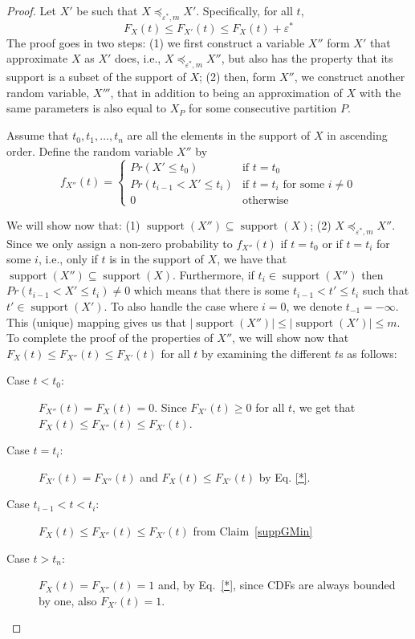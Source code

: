 \documentclass[review]{elsarticle}
\DeclareMathOperator{\support}{support}
\begin{document}
\begin{proof}
Let $X'$ be such that $X \preceq_{\varepsilon^*,m} X'$. Specifically, for all $t$,
\begin{equation}
F_{X}(t) \leq F_{X'}(t) \leq F_X(t)+\varepsilon^*
\label{*}
\end{equation}
The proof goes in two steps: (1) we first construct a variable $X''$ form $X'$ that approximate $X$ as $X'$ does, i.e., $X \preceq_{\varepsilon^*,m} X''$, but also has the property that its support is a subset of the support of $X$; (2) then, form $X''$, we construct another random variable, $X'''$, that in addition to being an approximation of $X$ with the same parameters is also equal to $X_P$ for some consecutive partition $P$. 


Assume that $t_0,t_1,\dots,t_n$ are all the elements in the support of $X$ in ascending order. Define the random variable $X''$ by 
$$
f_{X''}(t) = \begin{cases}
Pr(X' \leq t_0)           & \text{if } t=t_0  \\ 
Pr(t_{i-1} < X' \leq t_i) & \text{if } t=t_i \text{ for some } i \neq 0 \\ 
0                         & \text{otherwise}
\end{cases}
$$

We will show now that: (1) $\support(X'') \subseteq \support(X)$; (2) $X \preceq_{\varepsilon^*,m} X''$.
Since we only assign a non-zero probability to $f_{X''}(t)$ if $t=t_0$ or if $t=t_i$ for some $i$, i.e., only if $t$ is in the support of $X$, we have that $\support(X'') \subseteq \support(X)$. 
Furthermore, if $t_i \in \support(X'')$ then $Pr(t_{i-1} < X' \leq t_i) \neq 0$ which means that there is some $t_{i-1} < t' \leq t_i$ such that $t' \in \support(X')$. To also handle the case where $i=0$, we denote $t_{-1}=-\infty$. This (unique) mapping gives us that $|\support(X'')| \leq |\support(X')| \leq m$. To complete the proof of the properties of $X''$, we will show now that $F_{X}(t) \leq  F_{X''}(t) \leq F_{X'}(t)$ for all $t$ by examining the different $t$s as follows: 
\begin{description}
\item[Case $t < t_0$:] $F_{X''}(t)=F_{X}(t)=0$. Since $F_{X'}(t) \geq 0$ for all $t$, we get that $F_{X}(t) \leq  F_{X''}(t) \leq F_{X'}(t)$.
\item[Case $t=t_i$:] $F_{X'}(t)=F_{X''}(t)$ and $F_{X}(t) \leq F_{X'}(t)$ by Eq. \eqref{*}.
\item[Case $t_{i-1} < t < t_i$:]
$F_{X}(t) \leq F_{X''}(t) \leq F_{X'}(t)$ from Claim~\ref{suppGMin}
\item[Case $t > t_n$:] $F_{X}(t)= F_{X''}(t)=1$ and, by Eq.~\eqref{*}, since CDFs are always bounded by one, also $F_{X'}(t)=1$.


\end{description}
\end{proof}
\end{document}
